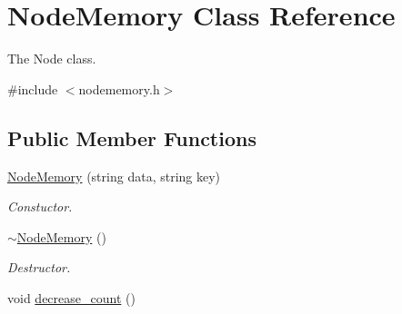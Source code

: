 \hypertarget{classNodeMemory}{}\section{Node\+Memory Class Reference}
\label{classNodeMemory}


The Node class.  




{\ttfamily \#include $<$nodememory.\+h$>$}

\subsection*{Public Member Functions}
\begin{DoxyCompactItemize}
\item 
\hyperlink{classNodeMemory_ae2440200dfdce77396bf2ef5d3c309b4}{Node\+Memory} (string data, string key)
\begin{DoxyCompactList}\small\item\em Constuctor. \end{DoxyCompactList}\item 
\hyperlink{classNodeMemory_a85d4c77ac5a989c3037e40a40ab184ed}{$\sim$\+Node\+Memory} ()\hypertarget{classNodeMemory_a85d4c77ac5a989c3037e40a40ab184ed}{}\label{classNodeMemory_a85d4c77ac5a989c3037e40a40ab184ed}

\begin{DoxyCompactList}\small\item\em Destructor. \end{DoxyCompactList}\item 
void \hyperlink{classNodeMemory_a26593fa8b33c86e67c617d2aefd7acd3}{decrease\+\_\+count} ()\hypertarget{classNodeMemory_a26593fa8b33c86e67c617d2aefd7acd3}{}\label{classNodeMemory_a26593fa8b33c86e67c617d2aefd7acd3}


\end{DoxyCompactItemize}
